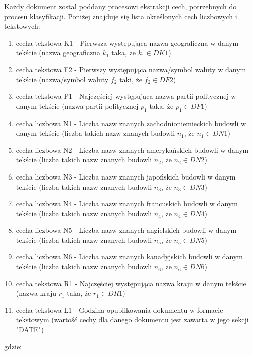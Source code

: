 \documentclass{classrep}
\begin{document}
Każdy dokument został poddany procesowi ekstrakcji cech, potrzebnych do procesu klasyfikacji.
Poniżej znajduje się lista określonych cech liczbowych i tekstowych:
\begin{enumerate}
\item cecha tekstowa K1 - Pierwsza występująca nazwa geograficzna w danym tekście (nazwa geograficzna $k_1$ taka, że $k_1 \in DK1$)
\item cecha tekstowa F2 - Pierwszy występująca nazwa/symbol waluty w danym tekście (nazwa/symbol waluty $f_2$ taki, że $f_2 \in DF2$)
\item cecha tekstowa P1 - Najczęściej występująca nazwa partii politycznej w danym tekście (nazwa partii politycznej $p_1$ taka, że $p_1 \in DP1$)
\item cecha liczbowa N1 - Liczba nazw znanych zachodnioniemieckich budowli w danym tekście (liczba takich nazw znanych budowli $n_1$, że $n_1 \in DN1$)
\item cecha liczbowa N2 - Liczba nazw znanych amerykańskich budowli w danym tekście (liczba takich nazw znanych budowli $n_2$, że $n_2 \in DN2$)
\item cecha liczbowa N3 - Liczba nazw znanych japońskich budowli w danym tekście (liczba takich nazw znanych budowli $n_3$, że $n_3 \in DN3$)
\item cecha liczbowa N4 - Liczba nazw znanych francuskich budowli w danym tekście (liczba takich nazw znanych budowli $n_4$, że $n_4 \in DN4$)
\item cecha liczbowa N5 - Liczba nazw znanych angielskich budowli w danym tekście (liczba takich nazw znanych budowli $n_5$, że $n_5 \in DN5$)
\item cecha liczbowa N6 - Liczba nazw znanych kanadyjskich budowli w danym tekście (liczba takich nazw znanych budowli $n_6$, że $n_6 \in DN6$)
\item cecha tekstowa R1 - Najczęściej występująca nazwa kraju w danym tekście (nazwa kraju $r_1$ taka, że $r_1 \in DR1$)
\item cecha tekstowa L1 - Godzina opublikowania dokumentu w formacie tekstowym (wartość cechy dla danego dokumentu jest zawarta w jego sekcji "DATE")
\end{enumerate}
gdzie:
\end{document}
